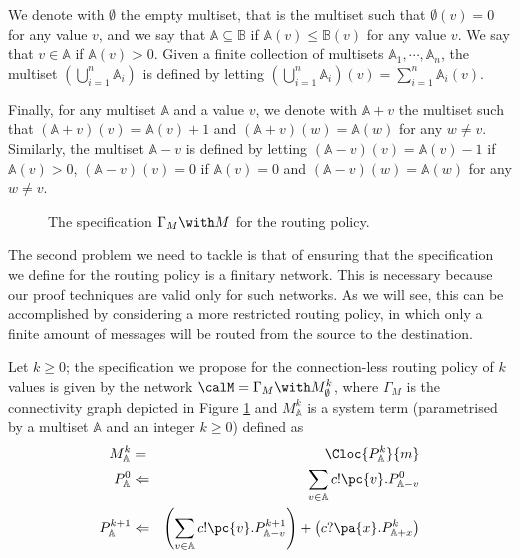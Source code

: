 \documentclass{LMCS}
\begin{document}
We denote with $\emptyset$ the empty multiset, 
that is the multiset such that $\emptyset(v) = 0$ 
for any value $v$, and we say that 
$\mathbb{A} \subseteq \mathbb{B}$ if $\mathbb{A}(v) \leq 
\mathbb{B}(v)$ for any value $v$. 
We say that $v \in \mathbb{A}$ if $\mathbb{A}(v) > 0$. 
Given a finite collection of multisets $\mathbb{A}_1,\cdots, 
\mathbb{A}_n$, the multiset $(\bigcup_{i=1}^n \mathbb{A}_i)$ 
is defined by letting $(\bigcup_{i=1}^n \mathbb{A}_i)(v) = 
\sum_{i=1}^n \mathbb{A}_i(v)$. 

Finally, for any multiset $\mathbb{A}$ and a value $v$, we denote 
with $\mathbb{A} + v$ the multiset such that 
$(\mathbb{A} + v)(v) = \mathbb{A}(v) + 1$ and 
$(\mathbb{A} + v)(w) = \mathbb{A}(w)$ for any 
$w \neq v$. Similarly, the multiset $\mathbb{A} - v$ 
is defined by letting $(\mathbb{A} - v)(v) = 
\mathbb{A}(v) - 1$ if $\mathbb{A}(v) > 0$, 
$(\mathbb{A} - v)(v) = 0$ if $\mathbb{A}(v) = 0$ 
and $(\mathbb{A} - v)(w) = \mathbb{A}(w)$ for any 
$w \neq v$.

\begin{figure}
\caption{The specification $\Gamma_M \with M$ for the routing policy.}
\label{fig:routing.model}
\end{figure}

The second problem we need to tackle is that of ensuring 
that the specification we define for the routing policy 
is a finitary network. 
This is necessary because our proof techniques 
are valid only for such networks. As we will see, 
this can be accomplished by considering a more restricted 
routing policy, in which only a finite amount of messages 
will be routed from the source to the destination.

Let $k \geq 0$; the specification we propose for the connection-less 
routing policy of $k$ values is given by the network 
$\calM = \Gamma_M \with M^k_{\emptyset}$, where 
$\Gamma_M$ is the connectivity graph depicted 
in Figure \ref{fig:routing.model}
and $M^k_{\mathbb{A}}$ is a system term (parametrised 
by a multiset $\mathbb{A}$ and an integer $k \geq 0$) 
defined as 
\begin{eqnarray*}
M^k_{\mathbb{A}} &=& \Cloc{P^{k}_\mathbb{A}}{m}\\
P^0_{\mathbb{A}} &\Leftarrow& \sum_{v \in \mathbb{A}} c!\pc{v}.P^0_{\mathbb{A} - v}\\
P^{k+1}_{\mathbb{A}} &\Leftarrow& \left(\sum_{v \in \mathbb{A}} c!\pc{v}.P^{k+1}_{\mathbb{A} - v}\right) +  
\left(c?\pa{x}.P^{k}_{\mathbb{A} + x}\right)
\end{eqnarray*}\smallskip
\end{document}
